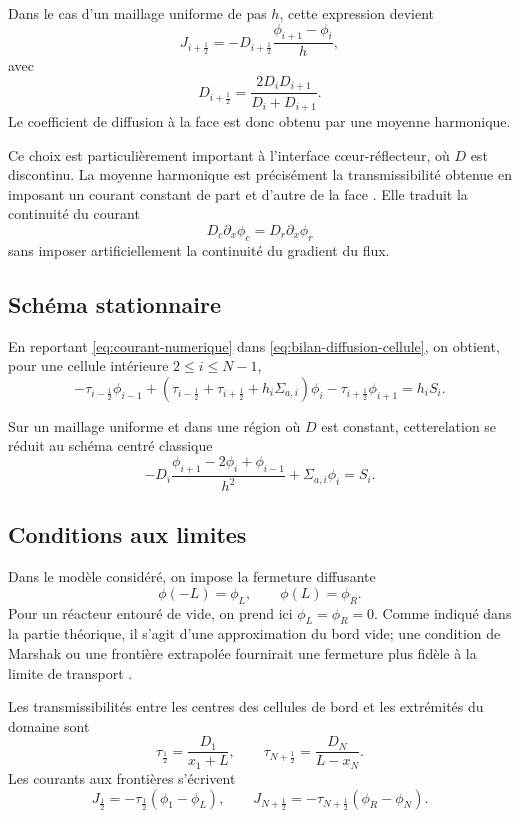 \documentclass{article}
\begin{document}
Dans le cas d'un maillage uniforme de pas $h$, cette expression devient
\[
    J_{i+\frac12} = -D_{i+\frac12} \frac{\phi_{i+1}-\phi_i}{h},
\]
avec
\begin{equation}
    D_{i+\frac12} = \frac{2D_iD_{i+1}}{D_i+D_{i+1}}.
    \label{eq:moyenne-harmonique}
\end{equation}
Le coefficient de diffusion à la face est donc obtenu par une moyenne
harmonique.

Ce choix est particulièrement important à l'interface cœur-réflecteur, où $D$ est discontinu. La moyenne harmonique est précisément la transmissibilité obtenue en imposant un courant constant de part et d'autre de la face \cite{Eymard2000}. Elle traduit la continuité du courant
\[
    D_c\partial_x\phi_c = D_r\partial_x\phi_r
\]
sans imposer artificiellement la continuité du gradient du flux.

\subsection {Schéma stationnaire}

En reportant \eqref{eq:courant-numerique} dans \eqref{eq:bilan-diffusion-cellule}, on obtient, pour une cellule intérieure $2\leq i\leq N-1$,
\begin{equation}
    - \tau_{i-\frac12}\phi_{i-1}
    + \left( \tau_{i-\frac12} +\tau_{i+\frac12} +h_i\Sigma_{a,i}\right)\phi_i
    - \tau_{i+\frac12}\phi_{i+1}
    = h_iS_i.
    \label{eq:schema-diffusion-interieur}
\end{equation}

Sur un maillage uniforme et dans une région où $D$ est constant, cetterelation se réduit au schéma centré classique
\[
    -D_i\frac{\phi_{i+1}-2\phi_i+\phi_{i-1}}{h^2} +\Sigma_{a,i}\phi_i = S_i.
\]

\subsection {Conditions aux limites}

Dans le modèle considéré, on impose la fermeture diffusante
\[
    \phi(-L)=\phi_L, \qquad \phi(L)=\phi_R.
\]
Pour un réacteur entouré de vide, on prend ici $\phi_L=\phi_R=0$. Comme indiqué dans la partie théorique, il s'agit d'une approximation du bord vide; une condition de Marshak ou une frontière extrapolée fournirait une fermeture plus fidèle à la limite de transport \cite[chap.~4, section~4.3]{Allaire2018}.

Les transmissibilités entre les centres des cellules de bord et les extrémités du domaine sont
\[
    \tau_{\frac12} = \frac{D_1}{x_1+L},
    \qquad
    \tau_{N+\frac12} = \frac{D_N}{L-x_N}.
\]
Les courants aux frontières s'écrivent
\[
    J_{\frac12} = -\tau_{\frac12}(\phi_1-\phi_L),
    \qquad
    J_{N+\frac12} = -\tau_{N+\frac12}(\phi_R-\phi_N).
\]
\end{document}
